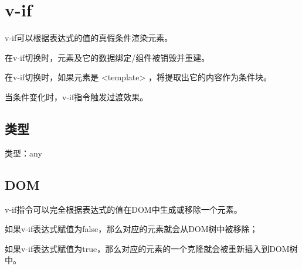 \begin{lstlisting}[language=JavaScript]

\end{lstlisting}




\begin{lstlisting}[language=JavaScript]

\end{lstlisting}




\begin{lstlisting}[language=JavaScript]

\end{lstlisting}

\chapter{v-if}

v-if可以根据表达式的值的真假条件渲染元素。

\begin{compactitem}
\item 在v-if切换时，元素及它的数据绑定/组件被销毁并重建。
\item 在v-if切换时，如果元素是 <template> ，将提取出它的内容作为条件块。
\end{compactitem}

当条件变化时，v-if指令触发过渡效果。

\section{类型}


\begin{compactitem}
\item 类型：any
\end{compactitem}



\section{DOM}

v-if指令可以完全根据表达式的值在DOM中生成或移除一个元素。

\begin{compactitem}
\item 如果v-if表达式赋值为false，那么对应的元素就会从DOM树中被移除；
\item 如果v-if表达式赋值为true，那么对应的元素的一个克隆就会被重新插入到DOM树中。
\end{compactitem}


